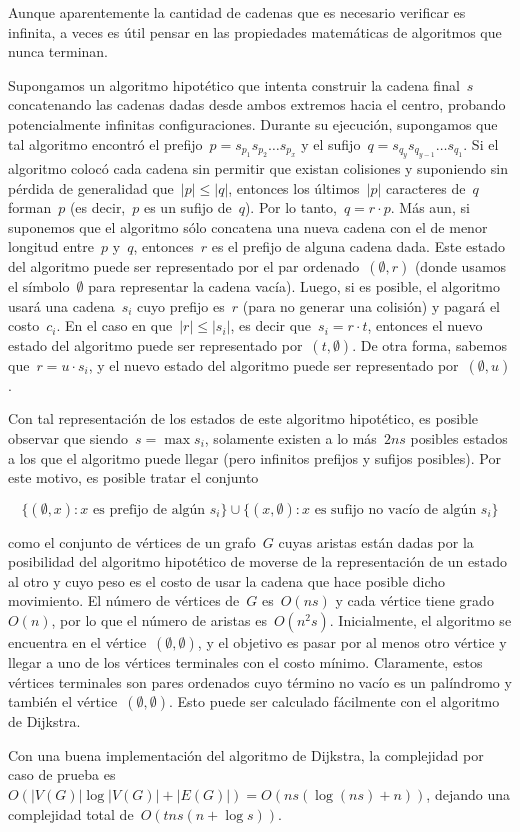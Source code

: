 
Aunque aparentemente la cantidad de cadenas que es necesario verificar es infinita, a
veces es útil pensar en las propiedades matemáticas de algoritmos que nunca terminan.

Supongamos un algoritmo hipotético que intenta construir la cadena final~$s$
concatenando las cadenas dadas desde ambos extremos hacia el centro, probando
potencialmente infinitas configuraciones. Durante su ejecución, supongamos que tal
algoritmo encontró el prefijo~$p = s_{p_1}s_{p_2}\dots s_{p_x}$ y el
sufijo~$q = s_{q_y}s_{q_{y-1}}\dots s_{q_1}$. Si el algoritmo colocó cada cadena sin
permitir que existan colisiones y suponiendo sin pérdida de generalidad
que~$|p| \leq |q|$, entonces los últimos~$|p|$ caracteres de~$q$ forman~$p$ (es
decir,~$p$ es un sufijo de~$q$). Por lo tanto,~$q = r\cdot p$. Más aun, si suponemos
que el algoritmo sólo concatena una nueva cadena con el de menor longitud entre~$p$
y~$q$, entonces~$r$ es el prefijo de alguna cadena dada. Este estado del algoritmo
puede ser representado por el par ordenado~$(\emptyset, r)$ (donde usamos el
símbolo~$\emptyset$ para representar la cadena vacía). Luego, si es posible, el
algoritmo usará una cadena~$s_i$ cuyo prefijo es~$r$ (para no generar una colisión) y
pagará el costo~$c_i$. En el caso en que~$|r| \leq |s_i|$, es decir
que~$s_i = r \cdot t$, entonces el nuevo estado del algoritmo puede ser representado
por~$(t, \emptyset)$. De otra forma, sabemos que~$r = u \cdot s_i$, y el nuevo estado
del algoritmo puede ser representado por~$(\emptyset, u)$.

Con tal representación de los estados de este algoritmo hipotético, es posible
observar que siendo~$s = \max s_i$, solamente existen a lo más~$2ns$ posibles estados
a los que el algoritmo puede llegar (pero infinitos prefijos y sufijos posibles). Por
este motivo, es posible tratar el conjunto

\begin{equation*}
  \{(\emptyset, x): x \text{ es prefijo de algún } s_i\}
  \cup
  \{(x, \emptyset): x \text{ es sufijo no vacío de algún } s_i\}
\end{equation*}

como el conjunto de vértices de un grafo~$G$ cuyas aristas están dadas por la
posibilidad del algoritmo hipotético de moverse de la representación de un estado al
otro y cuyo peso es el costo de usar la cadena que hace posible dicho movimiento. El
número de vértices de~$G$ es~$O(n s)$ y cada vértice tiene grado~$O(n)$, por lo que
el número de aristas es~$O(n^2 s)$. Inicialmente, el algoritmo se encuentra en el
vértice~$(\emptyset, \emptyset)$, y el objetivo es pasar por al menos otro vértice y
llegar a uno de los vértices terminales con el costo mínimo. Claramente, estos
vértices terminales son pares ordenados cuyo término no vacío es un palíndromo y
también el vértice~$(\emptyset, \emptyset)$. Esto puede ser calculado fácilmente con
el algoritmo de Dijkstra.

Con una buena implementación del algoritmo de Dijkstra, la complejidad por caso de
prueba es~$O(|V(G)|\log |V(G)| + |E(G)|) = O(ns(\log(ns) + n))$, dejando una
complejidad total de~$O(tns(n + \log s))$.


